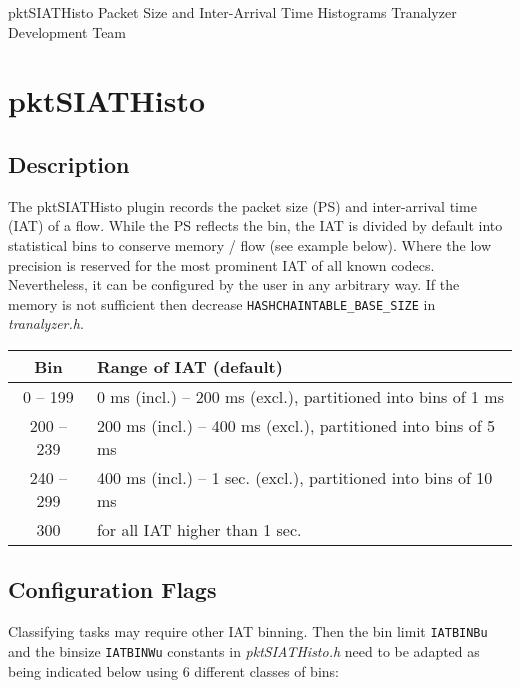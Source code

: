 \documentclass[documentation]{subfiles}
\begin{document}
\trantitle
    {pktSIATHisto}
    {Packet Size and Inter-Arrival Time Histograms}
    {Tranalyzer Development Team} %

\section{pktSIATHisto}\label{s:pktSIATHisto}

\subsection{Description}
The pktSIATHisto plugin records the packet size (PS) and inter-arrival time (IAT) of a flow.
While the PS reflects the bin, the IAT is divided by default into statistical bins to conserve memory / flow (see example below).
Where the low precision is reserved for the most prominent IAT of all known codecs. Nevertheless, it can be configured
by the user in any arbitrary way. If the memory is not sufficient then decrease {\tt HASHCHAINTABLE\_BASE\_SIZE} in {\em tranalyzer.h}.
\begin{longtable}{cl}
    \toprule
    {\bf Bin} & {\bf Range of IAT (default)} \\
    \midrule\endhead%
      0 -- 199 & 0 ms (incl.)   -- 200 ms (excl.), partitioned into bins of  1 ms \\
    200 -- 239 & 200 ms (incl.) -- 400 ms (excl.), partitioned into bins of  5 ms \\
    240 -- 299 & 400 ms (incl.) -- 1 sec. (excl.), partitioned into bins of 10 ms \\
    300        & for all IAT higher than 1 sec. \\
    \bottomrule
\end{longtable}

\subsection{Configuration Flags}

Classifying tasks may require other IAT binning. Then the bin limit {\tt IATBINBu} and the binsize {\tt IATBINWu} constants in {\em pktSIATHisto.h} need to be adapted as being indicated below using 6 different classes of bins:
\end{document}
